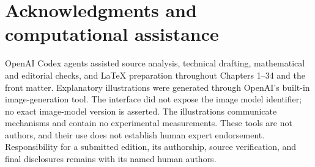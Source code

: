 \chapter*{Acknowledgments and computational assistance}
OpenAI Codex agents assisted source analysis, technical drafting, mathematical and editorial checks, and LaTeX preparation throughout Chapters 1--34 and the front matter. Explanatory illustrations were generated through OpenAI's built-in image-generation tool. The interface did not expose the image model identifier; no exact image-model version is asserted. The illustrations communicate mechanisms and contain no experimental measurements. These tools are not authors, and their use does not establish human expert endorsement. Responsibility for a submitted edition, its authorship, source verification, and final disclosures remains with its named human authors.
